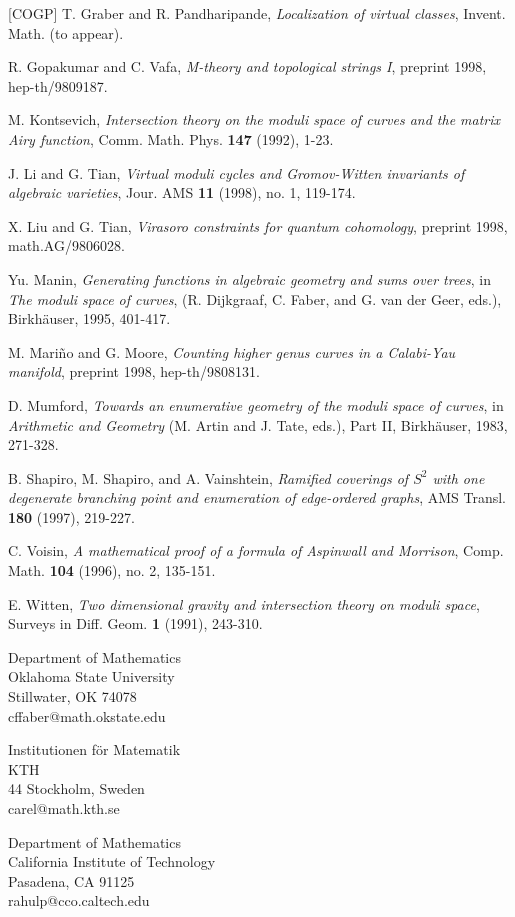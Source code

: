 \documentclass[11 pt]{amsart}
\begin{document}
\begin{thebibliography}{[COGP]}
 T. Graber and R. Pandharipande, {\em Localization
of virtual classes}, Invent. Math. (to appear).

 R. Gopakumar and C. Vafa, {\em M-theory and
topological strings I}, preprint 1998, hep-th/9809187.

 M. Kontsevich, {\em Intersection theory on the moduli
space of curves and the matrix Airy function}, Comm. Math. Phys.
{\bf 147} (1992), 1-23.

 J. Li and G. Tian, {\em Virtual moduli cycles
and Gromov-Witten invariants of algebraic varieties},
Jour. AMS {\bf{11}} (1998), no. 1, 119-174.

 X. Liu and G. Tian, {\em Virasoro constraints
for quantum cohomology}, preprint 1998, math.AG/9806028.

 Yu. Manin, {\em Generating functions in
algebraic geometry and sums over trees},
in {\em The moduli space of curves},
(R. Dijkgraaf, C. Faber, and G. van der Geer, eds.), Birkh\"auser,
1995, 401-417.

 M. Mari\~no and G. Moore, {\em Counting higher genus
curves in a Calabi-Yau manifold}, preprint 1998, hep-th/9808131.

 D. Mumford, {\em Towards an enumerative geometry of
the moduli space of curves}, in {\em Arithmetic and Geometry}
(M. Artin and J. Tate, eds.), Part II, Birkh\"auser, 1983, 271-328.

 B. Shapiro, M. Shapiro, and A. Vainshtein,
{\em Ramified coverings of $S^2$ with one degenerate branching point
and enumeration of edge-ordered graphs},
AMS Transl. {\bf 180} (1997), 219-227.

 C. Voisin, {\em A mathematical proof of a 
formula of Aspinwall and Morrison}, Comp.
Math. {\bf 104} (1996), no. 2, 135-151. 


 E. Witten, {\em Two dimensional gravity and intersection
theory on moduli space}, Surveys in Diff. Geom. {\bf 1} (1991), 243-310.

\end{thebibliography}
 
\vspace{+10 pt}
\noindent Department of Mathematics \\
\noindent Oklahoma State University \\
\noindent Stillwater, OK 74078 \\
\noindent cffaber@math.okstate.edu 

\vspace{+5pt}
\noindent Institutionen f\"or Matematik \\
\noindent KTH \\
 44 Stockholm, Sweden \\
\noindent carel@math.kth.se 

\vspace{+10 pt}
\noindent
Department of Mathematics \\
\noindent California Institute of Technology \\
\noindent Pasadena, CA 91125 \\
\noindent rahulp@cco.caltech.edu
\end{document}
